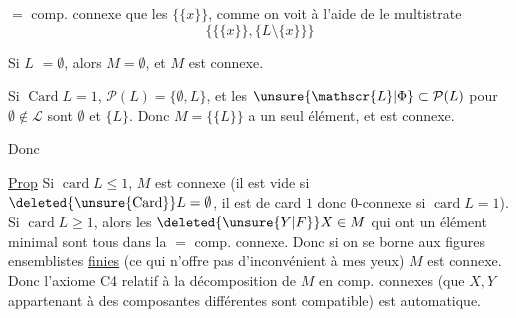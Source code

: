 $=$ comp. connexe que les $\{\{x\}\}$, comme on voit à l'aide de le multistrate
\[
\bigl\{\{\{x\}\},\{L\setminus\{x\}\}\bigr\}
\]

Si $L$  $=\emptyset$,   alors $M=\emptyset$, et $M$ est connexe.

Si $\operatorname{Card}L=1$, $\mathcal P(L)=\{\emptyset,L\}$, et les $\unsure{\mathscr{L}|\Phi}\subset\mathcal P(L)$    pour $\emptyset\notin\mathscr{L}$ sont $\emptyset$ et $\{L\}$. Donc $M=\{\{L\}\}$ a un seul élément, et est connexe.

Donc

\uline{Prop} Si $\operatorname{card}L\leq1$, $M$ est connexe (il est vide si $\deleted{\unsure{\mathrm{Card}}}L=\emptyset$, il est de card $1$ donc $0$-connexe si $\operatorname{card}L=1$). Si $\operatorname{card}L\geq1$, alors les $\deleted{\unsure{Y|F}}X\in M$ qui ont un élément minimal sont tous dans la $=$ comp. connexe. Donc si on se borne aux  figures ensemblistes \uline{finies} (ce qui n'offre pas d'inconvénient à mes yeux) $M$ est connexe. Donc l'axiome C4  relatif à la décomposition de $M$ en comp. connexes (que $X,Y$ appartenant à des composantes différentes sont compatible) est automatique.
